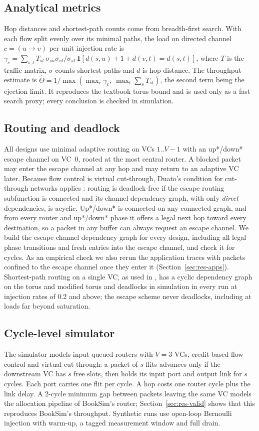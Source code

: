 \documentclass[preprint,12pt,a4paper]{elsarticle}
\begin{document}
\subsection{Analytical metrics}
\label{sec:metrics}
Hop distances and shortest-path counts come from breadth-first search. With
each flow split evenly over its minimal paths, the load on directed channel
$c=(u\to v)$ per unit injection rate is
$\gamma_c = \sum_{s,t} T_{st}\,\sigma_{su}\sigma_{vt}/\sigma_{st}\,
\mathbf{1}[d(s,u)+1+d(v,t)=d(s,t)]$, where $T$ is the traffic matrix,
$\sigma$ counts shortest paths and $d$ is hop distance. The throughput
estimate is $\hat\Theta = 1/\max(\max_c\gamma_c,\ \max_t\sum_s T_{st})$,
the second term being the ejection limit. It reproduces the textbook torus
bound \cite{dally2004principles} and is used only as a fast search proxy;
every conclusion is checked in simulation.

\subsection{Routing and deadlock}
All designs use minimal adaptive routing on VCs $1..V{-}1$ with an
up*/down* escape channel on VC~0, rooted at the most central router. A
blocked packet may enter the escape channel at any hop and may return to an
adaptive VC later. Because flow control is virtual cut-through, Duato's
condition for cut-through networks applies \cite{duato1996vct}: routing is
deadlock-free if the escape routing subfunction is connected and its
channel dependency graph, with only \emph{direct} dependencies, is acyclic.
Up*/down* is connected on any connected graph, and from every router and
up*/down* phase it offers a legal next hop toward every destination, so a
packet in any buffer can always request an escape channel. We build the
escape channel dependency graph for every design, including all legal phase
transitions and fresh entries into the escape channel, and check it for
cycles. As an empirical check we also rerun the application traces with
packets confined to the escape channel once they enter it
(Section~\ref{sec:res-apps}).
Shortest-path routing on a single VC, as used in \cite{thesis2023}, has a
cyclic dependency graph on the torus and modified torus and deadlocks in
simulation in every run at injection rates of 0.2 and above; the escape
scheme never deadlocks, including at loads far beyond saturation.

\subsection{Cycle-level simulator}
\label{sec:sim}
The simulator models input-queued routers with $V=3$ VCs, credit-based
flow control and virtual cut-through: a packet of $s$ flits advances only
if the downstream VC has $s$ free slots, then holds its input port and
output link for $s$ cycles. Each port carries one flit per cycle. A hop
costs one router cycle plus the link delay. A 2-cycle minimum gap between
packets leaving the same VC models the allocation pipeline of BookSim's
router; Section~\ref{sec:res-valid} shows that this reproduces BookSim's
throughput. Synthetic runs use open-loop Bernoulli injection with warm-up,
a tagged measurement window and full drain.
\end{document}
